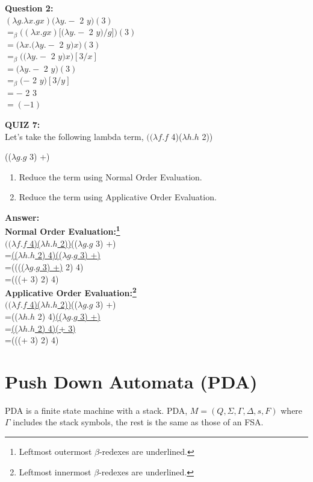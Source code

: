 \documentclass[12pt,a4paper]{article}
\begin{document}
{\noindent \textbf{Question 2:}\\
\noindent $(\lambda g.\lambda x.gx)(\lambda y.-$ 2 $y)(3)$\\
$=_{\beta}((\lambda x.gx)[(\lambda y.-$ 2 $y)/g])(3)$\\
$=(\lambda x.(\lambda y.-$ 2 $y)x)(3)$\\
$=_{\beta}((\lambda y.-$ 2 $y)x)[3/x]$\\
$=(\lambda y.-$ 2 $y)(3)$\\
$=_{\beta}(-$ 2 $y)[3/y]$\\
$=-$ 2 3\\
$=(-1)$\\

\clearpage

\noindent \textbf{\Large{QUIZ 7:}}\\
Let's take the following lambda term, $((\lambda f.f$ 4)($\lambda h.h$ 2))}(($\lambda g.g$ 3) +)

\begin{enumerate}
\item Reduce the term using Normal Order Evaluation.
\item Reduce the term using Applicative Order Evaluation.
\end{enumerate}



\noindent \textbf{\Large{Answer:}}\\

\noindent \textbf{Normal Order Evaluation:\footnote{Leftmost outermost $\beta$-redexes are underlined.}} \\
\underline{$((\lambda f.f$ 4)($\lambda h.h$ 2))}(($\lambda g.g$ 3) +)\\
=\underline{(($\lambda h.h$ 2) 4)(($\lambda g.g$ 3) +)}\\
=(((\underline{($\lambda g.g$ 3) +)} 2) 4)\\
=(((+ 3) 2) 4)\\

\noindent \textbf{Applicative Order Evaluation:\footnote{Leftmost innermost $\beta$-redexes are underlined.}}\\
\underline{$((\lambda f.f$ 4)($\lambda h.h$ 2))}(($\lambda g.g$ 3) +)\\
=(($\lambda h.h$ 2) 4)\underline{(($\lambda g.g$ 3) +)}\\
=\underline{(($\lambda h.h$ 2) 4)(+ 3)}\\
=(((+ 3) 2) 4)\\
\clearpage

\section{Push Down Automata (PDA)}
PDA is a finite state machine with a stack. PDA, $M=(Q,\Sigma,\Gamma,\Delta,s,F)$ where $\Gamma$ includes the stack symbols, the rest is the same as those of an FSA.\\
\end{document}
